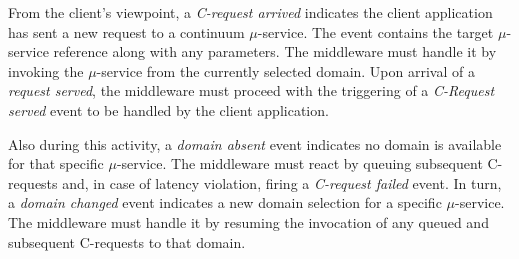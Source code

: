 From the client's viewpoint, a \textit{C-request arrived} indicates the client application has sent a new request to a continuum $\mu$-service. The event contains the target $\mu$-service reference along with any parameters. The middleware must handle it by invoking the $\mu$-service from the currently selected domain. Upon arrival of a \textit{request served}, the middleware must proceed with the triggering of a \textit{C-Request served} event to be handled by the client application. 

Also during this activity, a \textit{domain absent} event indicates no domain is available for that specific $\mu$-service. The middleware must react by queuing subsequent C-requests and, in case of latency violation, firing a \textit{C-request failed} event. In turn, a \textit{domain changed} event indicates a new domain selection for a specific $\mu$-service. The middleware must handle it by resuming the invocation of any queued and subsequent C-requests to that domain.

%
%
%		
%		
%		
%		
%		
%		

